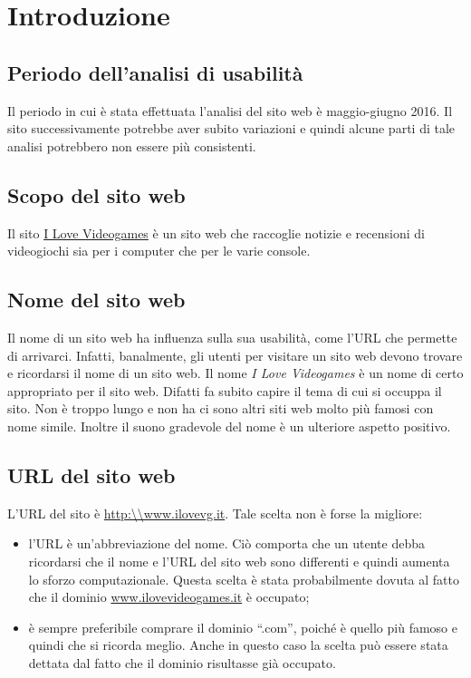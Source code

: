 \documentclass[../ProgettoTecWeb2.tex]{subfiles}
\begin{document}
\section{Introduzione}
	\subsection{Periodo dell'analisi di usabilità}
	Il periodo in cui è stata effettuata l'analisi del sito web è maggio-giugno 2016. Il sito successivamente potrebbe aver subito variazioni e quindi alcune parti di tale analisi potrebbero non essere più consistenti.

	\subsection{Scopo del sito web}
	Il sito \href{http://ilovevg.it/}{I Love Videogames} è un sito web che raccoglie notizie e  recensioni di videogiochi sia per i computer che per le varie console.

	\subsection{Nome del sito web}
	Il nome di un sito web ha influenza sulla sua usabilità, come l'URL che permette di arrivarci. Infatti, banalmente, gli utenti per visitare un sito web devono trovare e ricordarsi il nome di un sito web. Il nome \textit{I Love Videogames} è un nome di certo appropriato per il sito web. Difatti fa subito capire il tema di cui si occuppa il sito. Non è troppo lungo e non ha ci sono altri siti web molto più famosi con nome simile. Inoltre il suono gradevole del nome è un ulteriore aspetto positivo.

	\subsection{URL del sito web}
	L'URL del sito è \url{http:\\www.ilovevg.it}. Tale scelta non è forse la migliore:
	\begin{itemize}
		\item l'URL è un'abbreviazione del nome. Ciò comporta che un utente debba ricordarsi che il nome e l'URL del sito web sono differenti e quindi aumenta lo sforzo computazionale. Questa scelta è stata probabilmente dovuta al fatto che il dominio \url{www.ilovevideogames.it} è occupato;
		\item è sempre preferibile comprare il dominio ``.com'', poiché è quello più famoso e quindi che si ricorda meglio. Anche in questo caso la scelta può essere stata dettata dal fatto che il dominio risultasse già occupato.
	\end{itemize}
\end{document}

